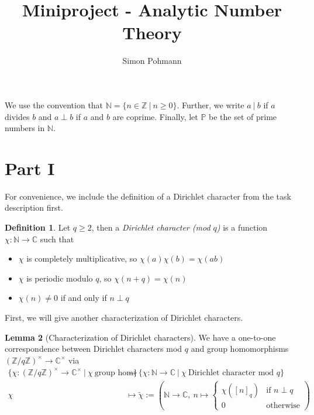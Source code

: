 \documentclass{scrartcl}
\title{Miniproject - Analytic Number Theory}
\author{Simon Pohmann}
\date{}
\newcommand{\primes}{\mathbb{P}}
\newcommand{\N}{\mathbb{N}}
\newcommand{\Z}{\mathbb{Z}}
\newcommand{\C}{\mathbb{C}}
\newcommand{\divides}{\ | \ }
\newcommand{\units}{\times}
\theoremstyle{definition}
\newtheorem{definition}{Definition}
\newtheorem{lemma}[definition]{Lemma}
\begin{document}
\maketitle
We use the convention that $\N = \{ n \in \Z \ | \ n \geq 0 \}$.
Further, we write $a \divides b$ if $a$ divides $b$ and $a \perp b$ if $a$ and $b$ are coprime.
Finally, let $\primes$ be the set of prime numbers in $\N$.

\section{Part I}

For convenience, we include the definition of a Dirichlet character from the task description first.
\begin{definition}
    Let $q \geq 2$, then a \emph{Dirichlet character (mod $q$)} is a function $\chi: \N \to \C$ such that
    \begin{itemize}
        \item $\chi$ is completely multiplicative, so $\chi(a)\chi(b) = \chi(ab)$
        \item $\chi$ is periodic modulo $q$, so $\chi(n + q) = \chi(n)$
        \item $\chi(n) \neq 0$ if and only if $n \perp q$
    \end{itemize}
\end{definition}
First, we will give another characterization of Dirichlet characters.
\begin{lemma}[Characterization of Dirichlet characters]
    \label{prop:characterization_dirichlet_character}
    We have a one-to-one correspondence between Dirichlet characters mod $q$ and group homomorphisms $(\Z/q\Z)^\units \to \C^\units$ via
    \begin{align*}
        \{ \chi: (\Z/q\Z)^\units \to \C^\units \ | \ \chi \ \text{group hom} \} &\to \{ \chi: \N \to \C \ | \ \chi \ \text{Dirichlet character mod $q$} \} \\
        \chi &\mapsto \tilde{\chi} := \left( \N \to \C, \ n \mapsto \begin{cases}
            \chi([n]_q) & \text{if $n \perp q$} \\
            0 & \text{otherwise}
        \end{cases} \right)
    \end{align*}
\end{lemma}
\end{document}
